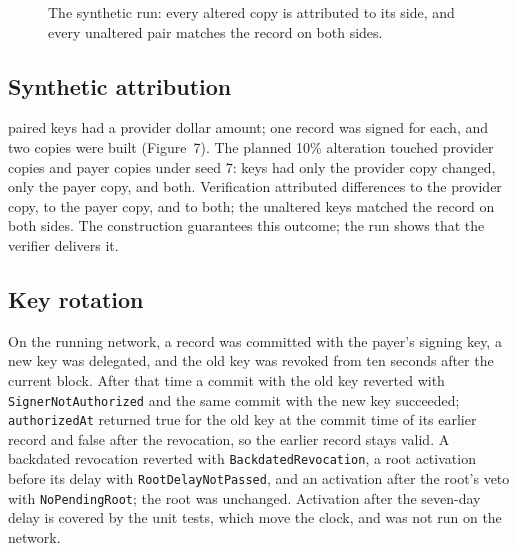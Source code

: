 \documentclass[10pt]{article}
\begin{document}
\begin{figure}[!htb]
\centering
{}
\caption{The synthetic run: every altered copy is attributed to its side, and every unaltered pair matches the record on both sides.}
\end{figure}

\subsection*{Synthetic attribution}

\synKeys{} paired keys had a provider dollar amount; one record was signed for each, and two copies were built (Figure~7). The planned 10\% alteration touched \synProvAlteredAll{} provider copies and \synPayAlteredAll{} payer copies under seed 7: \synProvAltered{} keys had only the provider copy changed, \synPayAltered{} only the payer copy, and \synBothAltered{} both. Verification attributed \synProviderDeparts{} differences to the provider copy, \synPayerDeparts{} to the payer copy, and \synNeither{} to both; the \synUnaltered{} unaltered keys matched the record on both sides. The construction guarantees this outcome; the run shows that the verifier delivers it.

\subsection*{Key rotation}

On the running network, a record was committed with the payer's signing key, a new key was delegated, and the old key was revoked from ten seconds after the current block. After that time a commit with the old key reverted with \texttt{SignerNotAuthorized} and the same commit with the new key succeeded; \texttt{authorizedAt} returned true for the old key at the commit time of its earlier record and false after the revocation, so the earlier record stays valid. A backdated revocation reverted with \texttt{BackdatedRevocation}, a root activation before its delay with \texttt{RootDelayNotPassed}, and an activation after the root's veto with \texttt{NoPendingRoot}; the root was unchanged. Activation after the seven-day delay is covered by the unit tests, which move the clock, and was not run on the network.
\end{document}
